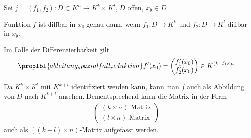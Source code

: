 \begin{lemma}
	Sei $f=(f_1, f_2):D\subset K^n\to K^k\times K^l$, $D$ offen, $x_0\in D$.
	
	Funktion $f$ ist  \gls{diffbar} in $x_0$ genau dann, wenn $f_1:D\to K^k$ und $f_2 :D\to K^l$  \gls{diffbar} in $x_0$.
	
	Im Falle der Differenzierbarkeit gilt\begin{align}
		\proplbl{ableitung_spezialfall_reduktion}
		f'(x_0) = \begin{pmatrix}
			f_1'(x_0) \\ f_2'(x_0)
		\end{pmatrix} \in K^{(k+l)\times n}
	\end{align}
	
	\begin{hint}
		Da $K^k\times K^l$ mit $K^{k+l}$ identifiziert werden kann, kann man $f$ auch als Abbildung von $D$ nach $K^{k+l}$ ansehen. Dementsprechend kann die Matrix in  der Form \begin{align*}
			\begin{pmatrix}
				(k\times n) \text{ Matrix} \\
				(l\times n) \text{ Matrix}
			\end{pmatrix}
		\end{align*}
		auch als $((k+l)\times n)$-Matrix aufgefasst werden.
	\end{hint}
\end{lemma}

